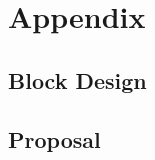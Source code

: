 \chapter{Appendix}\label{C:appendix}
\section{Block Design}
\label{appendix:blockdesign}

\section{Proposal}

